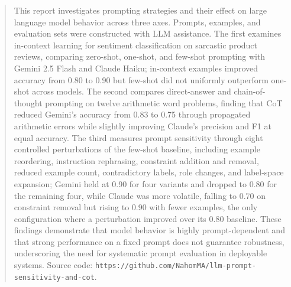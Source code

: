 \begin{titlepage}
\begin{center}
    \end{center}
   \vspace{0.2cm}
    \begin{abstract}
        \noindent This report investigates prompting strategies and their effect on large language model behavior across three axes. Prompts, examples, and evaluation sets were constructed with LLM assistance. The first examines in-context learning for sentiment classification on sarcastic product reviews, comparing zero-shot, one-shot, and few-shot prompting with Gemini 2.5 Flash and Claude Haiku; in-context examples improved accuracy from 0.80 to 0.90 but few-shot did not uniformly outperform one-shot across models. The second compares direct-answer and chain-of-thought prompting on twelve arithmetic word problems, finding that CoT reduced Gemini's accuracy from 0.83 to 0.75 through propagated arithmetic errors while slightly improving Claude's precision and F1 at equal accuracy. The third measures prompt sensitivity through eight controlled perturbations of the few-shot baseline, including example reordering, instruction rephrasing, constraint addition and removal, reduced example count, contradictory labels, role changes, and label-space expansion; Gemini held at 0.90 for four variants and dropped to 0.80 for the remaining four, while Claude was more volatile, falling to 0.70 on constraint removal but rising to 0.90 with fewer examples, the only configuration where a perturbation improved over its 0.80 baseline. These findings demonstrate that model behavior is highly prompt-dependent and that strong performance on a fixed prompt does not guarantee robustness, underscoring the need for systematic prompt evaluation in deployable systems. Source code: \texttt{https://github.com/NahomMA/llm-prompt-sensitivity-and-cot}.
    \end{abstract}

\end{titlepage}